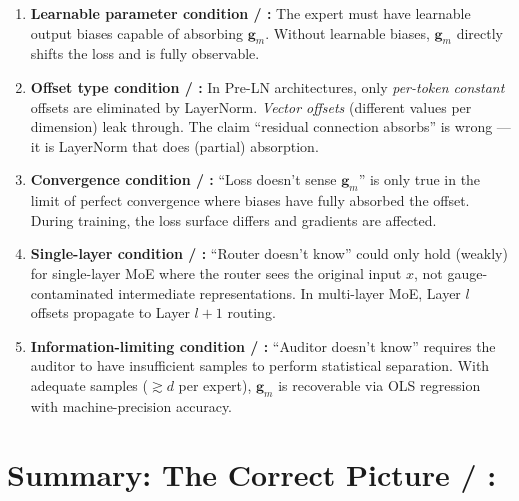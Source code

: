 \documentclass[11pt,a4paper]{article}
\newcommand{\gauge}{\mathbf{g}}
\begin{document}
\begin{enumerate}
    \item \textbf{Learnable parameter condition / :}
    The expert must have learnable output biases capable of absorbing $\gauge_m$.
    Without learnable biases, $\gauge_m$ directly shifts the loss and is
    fully observable.

    \item \textbf{Offset type condition / :}
    In Pre-LN architectures, only \textit{per-token constant} offsets are
    eliminated by LayerNorm. \textit{Vector offsets} (different values per
    dimension) leak through. The claim ``residual connection absorbs'' is
    wrong — it is LayerNorm that does (partial) absorption.

    \item \textbf{Convergence condition / :}
    ``Loss doesn't sense $\gauge_m$'' is only true in the limit of perfect
    convergence where biases have fully absorbed the offset. During training,
    the loss surface differs and gradients are affected.

    \item \textbf{Single-layer condition / :}
    ``Router doesn't know'' could only hold (weakly) for single-layer MoE
    where the router sees the original input $x$, not gauge-contaminated
    intermediate representations. In multi-layer MoE, Layer $l$ offsets
    propagate to Layer $l+1$ routing.

    \item \textbf{Information-limiting condition / :}
    ``Auditor doesn't know'' requires the auditor to have insufficient samples
    to perform statistical separation. With adequate samples ($\gtrsim d$ per
    expert), $\gauge_m$ is recoverable via OLS regression with
    machine-precision accuracy.
\end{enumerate}

\section{Summary: The Correct Picture / : }
\end{document}
